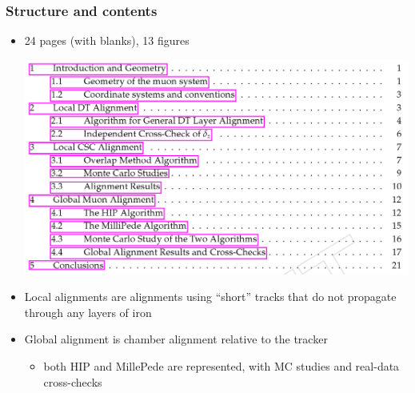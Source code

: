 \documentclass[compress]{beamer}
\begin{document}
\begin{frame}
\frametitle{Structure and contents}

\begin{itemize}
\item 24 pages (with blanks), 13 figures

\begin{center}
\includegraphics[width=0.8\linewidth]{contents.png}
\end{center}

\item Local alignments are alignments using ``short'' tracks that do not propagate through any layers of iron

\item Global alignment is chamber alignment relative to the tracker
\begin{itemize}
\item both HIP and MillePede are represented, with MC studies and real-data cross-checks
\end{itemize}
\end{itemize}
\end{frame}
\end{document}
